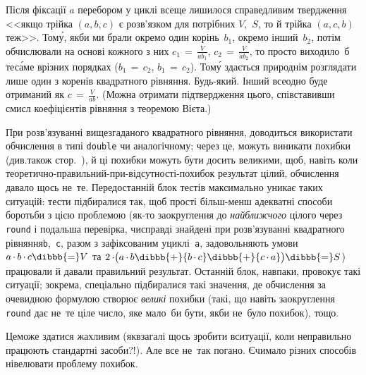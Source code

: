 Після фіксації $a$ перебором у циклі все\nolinebreak[3] ще лишилося справедливим твердження <<якщо трійка $(a, b, c)$ є розв'язком для потрібних $V$,~$S$, то й трійка $(a, c, b)$ теж>>. 
Том\'{у}, якби ми брали окремо один корінь~$b_1$, окремо інший~$b_2$, потім обчислювали на основі кожного з них 
${c_1\,{=}\,\frac{V}{ab_1}}$,
${c_2\,{=}\,\frac{V}{ab_2}}$,
то просто виходило~б 
те\nolinebreak[3] с\'{а}ме в\nolinebreak[3] різних порядках
(${b_1\,{=}\,c_2}$,
${b_1\,{=}\,c_2}$).
Том\'{у} здається природнім розглядати лише один з коренів квадратного рівняння. Будь-який. Інший все\nolinebreak[3] одно буде отриманий як $c\,{=}\,\frac{V}{ab}$.
(Можна отримати підтвердження цього, співставивши смисл коефіцієнтів рівняння з теоремою Вієта.) 

При розв'язуванні вищезгаданого квадратного рівняння, доводиться використати обчислення в типі \verb"double" чи аналогічному; через це, можуть виникати похибки (див.\nolinebreak[3] також стор.~\pageref{text:floating-point-error-in-0.3}), й ці похибки можуть бути досить великими, щоб, навіть коли теоретично-правильний-при-відсутності-похибок результат цілий, обчислення давало щось не~те. Передостанній блок тестів максимально уникає таких ситуацій: тести підбиралися так, щоб прості більш-менш адекватні способи боротьби з цією проблемою (як-то заокруглення до \emph{найближчого} цілого через \texttt{round} і подальша перевірка, чи\nolinebreak[3] справді знайдені при розв'язуванні квадратного рівняння\nolinebreak[3] \texttt{b},~\texttt{c}, разом з зафіксованим у\nolinebreak[3] циклі~\texttt{a}, задовольняють умови ${a\,{\cdot}\,b\,{\cdot}\,c}\dibbb{{=}}V$ та ${2\,{\cdot}\bigl(a\,{\cdot}\,b}\dibbb{{+}}{b\,{\cdot}\,c}\dibbb{{+}}{c\,{\cdot}\,a}\bigr)\dibbb{{=}}S$) працювали й давали правильний результат. Останній блок, навпаки, провокує такі ситуації; зокрема, спеціально підбиралися такі значення, де обчислення за очевидною формулою створює \emph{великі} похибки (такі, що навіть заокруглення \texttt{round} дає не~те ціле число, яке мало~би бути, якби не~було похибок), тощо.

Це\nolinebreak[3] може здатися жахливим (як\nolinebreak[3] взагалі щось зробити в\nolinebreak[3] ситуації, коли неправильно працюють стандартні засоби?!). Але все не~так погано. Є\nolinebreak[3] чимало різних способів нівелювати проблему похибок. 


